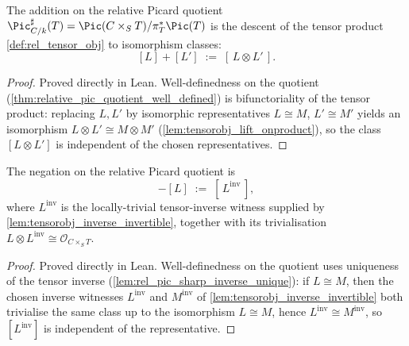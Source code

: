 \begin{definition}\leanok
  \label{def:rel_add}
  The addition on the relative Picard quotient
  \(\Pic^\sharp_{C/k}(T) = \Pic(C \times_S T)/\pi_T^*\Pic(T)\) is the descent of
  the tensor product \cref{def:rel_tensor_obj} to isomorphism classes:
  \[
    [L] + [L'] \;:=\; [\,L \otimes L'\,].
  \]
\end{definition}

\begin{proof}
  \leanok
  Proved directly in Lean. Well-definedness on the quotient
  (\cref{thm:relative_pic_quotient_well_defined}) is bifunctoriality of the
  tensor product: replacing \(L, L'\) by isomorphic representatives
  \(L \cong M\), \(L' \cong M'\) yields an isomorphism
  \(L \otimes L' \cong M \otimes M'\) (\cref{lem:tensorobj_lift_onproduct}),
  so the class \([L \otimes L']\) is independent of the chosen representatives.
\end{proof}

\begin{definition}\leanok
  \label{def:rel_neg}
  The negation on the relative Picard quotient is
  \[
    -[L] \;:=\; [\,L^{\mathrm{inv}}\,],
  \]
  where \(L^{\mathrm{inv}}\) is the locally-trivial tensor-inverse witness
  supplied by \cref{lem:tensorobj_inverse_invertible}, together with its
  trivialisation \(L \otimes L^{\mathrm{inv}} \cong \mathcal{O}_{C \times_S T}\).
\end{definition}

\begin{proof}
  \leanok
  Proved directly in Lean. Well-definedness on the quotient uses uniqueness of
  the tensor inverse (\cref{lem:rel_pic_sharp_inverse_unique}): if
  \(L \cong M\), then the chosen inverse witnesses \(L^{\mathrm{inv}}\) and
  \(M^{\mathrm{inv}}\) of \cref{lem:tensorobj_inverse_invertible} both trivialise
  the same class up to the isomorphism \(L \cong M\), hence
  \(L^{\mathrm{inv}} \cong M^{\mathrm{inv}}\), so \([L^{\mathrm{inv}}]\) is
  independent of the representative.
\end{proof}

